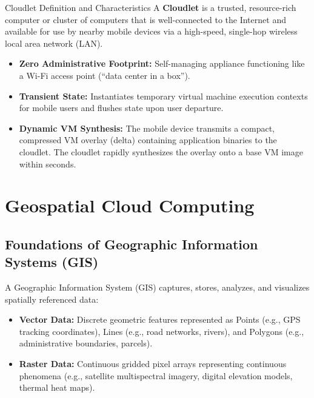 \begin{defbox}{Cloudlet Definition and Characteristics}
A \textbf{Cloudlet} is a trusted, resource-rich computer or cluster of computers that is well-connected to the Internet and available for use by nearby mobile devices via a high-speed, single-hop wireless local area network (LAN).
\begin{itemize}[leftmargin=*]
  \item \textbf{Zero Administrative Footprint:} Self-managing appliance functioning like a Wi-Fi access point (``data center in a box'').
  \item \textbf{Transient State:} Instantiates temporary virtual machine execution contexts for mobile users and flushes state upon user departure.
  \item \textbf{Dynamic VM Synthesis:} The mobile device transmits a compact, compressed VM overlay (delta) containing application binaries to the cloudlet. The cloudlet rapidly synthesizes the overlay onto a base VM image within seconds.
\end{itemize}
\end{defbox}

\section{Geospatial Cloud Computing}
\subsection{Foundations of Geographic Information Systems (GIS)}
A Geographic Information System (GIS) captures, stores, analyzes, and visualizes spatially referenced data:
\begin{itemize}[leftmargin=*]
  \item \textbf{Vector Data:} Discrete geometric features represented as Points (e.g., GPS tracking coordinates), Lines (e.g., road networks, rivers), and Polygons (e.g., administrative boundaries, parcels).
  \item \textbf{Raster Data:} Continuous gridded pixel arrays representing continuous phenomena (e.g., satellite multispectral imagery, digital elevation models, thermal heat maps).
\end{itemize}


